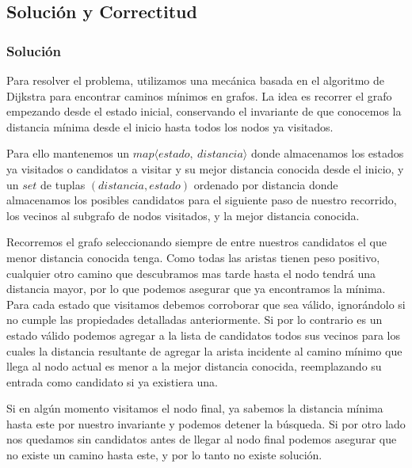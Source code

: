 \subsection{Solución y Correctitud}
    \subsubsection{Solución}

    Para resolver el problema, utilizamos una mecánica basada en el algoritmo de Dijkstra para encontrar caminos mínimos en grafos. La idea es recorrer el grafo empezando desde el estado inicial, conservando el invariante de que conocemos la distancia mínima desde el inicio hasta todos los nodos ya visitados.

    Para ello mantenemos un $map\langle {estado,\ distancia} \rangle$ donde almacenamos los estados ya visitados o candidatos a visitar y su mejor distancia conocida desde el inicio, y un $set$ de tuplas $(distancia, estado)$ ordenado por distancia donde almacenamos los posibles candidatos para el siguiente paso de nuestro recorrido, los vecinos al subgrafo de nodos visitados, y la mejor distancia conocida.

    Recorremos el grafo seleccionando siempre de entre nuestros candidatos el que menor distancia conocida tenga. Como todas las aristas tienen peso positivo, cualquier otro camino que descubramos mas tarde hasta el nodo tendrá una distancia mayor, por lo que podemos asegurar que ya encontramos la mínima. Para cada estado que visitamos debemos corroborar que sea válido, ignorándolo si no cumple las propiedades detalladas anteriormente. Si por lo contrario es un estado válido podemos agregar a la lista de candidatos todos sus vecinos para los cuales la distancia resultante de agregar la arista incidente al camino mínimo que llega al nodo actual es menor a la mejor distancia conocida, reemplazando su entrada como candidato si ya existiera una.

    Si en algún momento visitamos el nodo final, ya sabemos la distancia mínima hasta este por nuestro invariante y podemos detener la búsqueda. Si por otro lado nos quedamos sin candidatos antes de llegar al nodo final podemos asegurar que no existe un camino hasta este, y por lo tanto no existe solución.
\\

